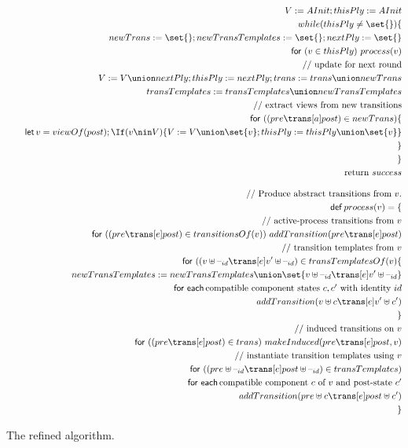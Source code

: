 \begin{figure}
\[
\begin{align}
V := AInit; thisPly := AInit \\
while(thisPly \ne \set{})\{ \\
\quad newTrans := \set{}; newTransTemplates := \set{}; nextPly := \set{} \\
\quad \For(v \in thisPly)\ process(v) \\
\quad \comment{update for next round} \\
\quad V := V \union nextPly; thisPly := nextPly; trans := trans \union newTrans \\
\quad  transTemplates := transTemplates \union newTransTemplates \\
\quad \comment{extract views from new transitions} \\
\quad \For ((pre \trans[a] post) \in newTrans)\{ \\
\qquad \Let v = viewOf(post); 
  \If(v \nin V)\{ V := V \union \set{v}; thisPly := thisPly \union \set{v} \}\\
\quad \}\\
\} \\
\mbox{return $success$}
\\[2ex]
\comment{Produce abstract transitions from $v$.} \\
\Def process(v) = \{ \\ %
\quad \comment{active-process transitions from~$v$} \\
\quad \For ((pre \trans[e] post) \in transitionsOf(v)) \
   addTransition(pre \trans[e] post) \\
\quad \comment{transition templates from $v$} \\
\quad \For ((v \uplus \hole{id}  \trans[e] v' \uplus \hole{id}) 
  \in transTemplatesOf(v) \{ \\
\qquad  newTransTemplates := newTransTemplates \union
   \set{v \uplus \hole{id}  \trans[e] v' \uplus \hole{id}} \\
\qquad \Foreach \mbox{compatible component states~$c, c'$ with identity~$id$} \\
\qquad\quad           addTransition(v \uplus c \trans[e] v' \uplus c') \\
\quad \} \\
\quad \comment{induced transitions on~$v$} \\
\quad \For ((pre \trans[e] post) \in trans)\ 
  makeInduced(pre \trans[e] post,v) \\
\quad \comment{instantiate transition templates using $v$} \\
\quad \For ((pre \uplus \hole{id} \trans[e] post \uplus \hole{id})
   \in transTemplates) \\
\qquad  \Foreach \mbox{compatible component $c$ of $v$ and post-state~$c'$} \\
\qquad\quad addTransition(pre \uplus c \trans[e] post \uplus c') \\
\} %
\end{align}
\]
\caption{The refined algorithm.}
\label{fig:algorithm-2}
\end{figure}

